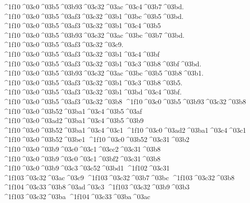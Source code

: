 {	^^^^1f10^^^^03c0^^^^03b5^^^^03b93^^^^03c32^^^^03ac^^^^03c4^^^^03b7^^^^03bd.
	^^^^1f10^^^^03c0^^^^03b5^^^^03af3^^^^03c32^^^^03b1^^^^03bc^^^^03b5^^^^03bd.
	^^^^1f10^^^^03c0^^^^03b5^^^^03af3^^^^03c32^^^^03b1^^^^03c4^^^^03b5
	^^^^1f10^^^^03c0^^^^03b5^^^^03b93^^^^03c32^^^^03ac^^^^03bc^^^^03b7^^^^03bd.
	^^^^1f10^^^^03c0^^^^03b5^^^^03af3^^^^03c32^^^^03c9.
	^^^^1f10^^^^03c0^^^^03b5^^^^03af3^^^^03c32^^^^03b1^^^^03c4^^^^03bf
	^^^^1f10^^^^03c0^^^^03b5^^^^03af3^^^^03c32^^^^03b1^^^^03c3^^^^03b8^^^^03bf^^^^03bd.
	^^^^1f10^^^^03c0^^^^03b5^^^^03b93^^^^03c32^^^^03ac^^^^03bc^^^^03b5^^^^03b8^^^^03b1.
	^^^^1f10^^^^03c0^^^^03b5^^^^03af3^^^^03c32^^^^03b1^^^^03c3^^^^03b8^^^^03b5.
	^^^^1f10^^^^03c0^^^^03b5^^^^03af3^^^^03c32^^^^03b1^^^^03bd^^^^03c4^^^^03bf.
	^^^^1f10^^^^03c0^^^^03b5^^^^03af3^^^^03c32^^^^03b8	%
	^^^^1f10^^^^03c0^^^^03b5^^^^03b93^^^^03c32^^^^03b8
^^^^1f10^^^^03c0^^^^03b52^^^^03ba1^^^^03c4^^^^03b5^^^^03af 		%
^^^^1f10^^^^03c0^^^^03ad2^^^^03ba1^^^^03c4^^^^03b5^^^^03b9
^^^^1f10^^^^03c0^^^^03b52^^^^03ba1^^^^03c4^^^^03c1 		%
^^^^1f10^^^^03c0^^^^03ad2^^^^03ba1^^^^03c4^^^^03c1
^^^^1f10^^^^03c0^^^^03b52^^^^03be1
^^^^1f10^^^^03c0^^^^03b52^^^^03c31^^^^03b2 		%
^^^^1f10^^^^03c0^^^^03b9^^^^03c0^^^^03c1^^^^03cc2^^^^03c31^^^^03b8		%
^^^^1f10^^^^03c0^^^^03b9^^^^03c0^^^^03c1^^^^03bf2^^^^03c31^^^^03b8
^^^^1f10^^^^03c0^^^^03b9^^^^03c3^^^^03c52^^^^03bd1  		%
^^^^1f102^^^^03c31
	^^^^1f103^^^^03c32^^^^03ac^^^^03c9 		%
	^^^^1f103^^^^03c32^^^^03b7^^^^03bc  		%
	^^^^1f103^^^^03c32^^^^03b8 			%
		^^^^1f104^^^^03c33^^^^03b8^^^^03ad^^^^03c3 		%
	^^^^1f103^^^^03c32^^^^03b9^^^^03b3 		%
	^^^^1f103^^^^03c32^^^^03ba
		^^^^1f104^^^^03c33^^^^03ba^^^^03ac 		%
}
